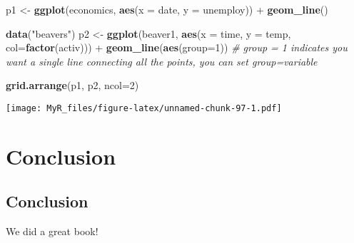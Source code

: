 \documentclass[]{book}
\newenvironment{Shaded}{}{}
\newcommand{\CommentTok}[1]{\textcolor[rgb]{0.38,0.63,0.69}{\textit{#1}}}
\newcommand{\DataTypeTok}[1]{\textcolor[rgb]{0.56,0.13,0.00}{#1}}
\newcommand{\DecValTok}[1]{\textcolor[rgb]{0.25,0.63,0.44}{#1}}
\newcommand{\KeywordTok}[1]{\textcolor[rgb]{0.00,0.44,0.13}{\textbf{#1}}}
\newcommand{\NormalTok}[1]{#1}
\newcommand{\OperatorTok}[1]{\textcolor[rgb]{0.40,0.40,0.40}{#1}}
\newcommand{\StringTok}[1]{\textcolor[rgb]{0.25,0.44,0.63}{#1}}
\theoremstyle{definition}
\theoremstyle{definition}
\theoremstyle{definition}
\theoremstyle{remark}
\begin{document}
\begin{Shaded}
\begin{Highlighting}[]
\NormalTok{p1 <-}\StringTok{ }\KeywordTok{ggplot}\NormalTok{(economics, }\KeywordTok{aes}\NormalTok{(}\DataTypeTok{x =}\NormalTok{ date, }\DataTypeTok{y =}\NormalTok{ unemploy)) }\OperatorTok{+}\StringTok{ }
\KeywordTok{geom_line}\NormalTok{()}

\KeywordTok{data}\NormalTok{(}\StringTok{"beavers"}\NormalTok{)}
\NormalTok{p2 <-}\StringTok{ }\KeywordTok{ggplot}\NormalTok{(beaver1, }\KeywordTok{aes}\NormalTok{(}\DataTypeTok{x =}\NormalTok{ time, }\DataTypeTok{y =}\NormalTok{ temp, }\DataTypeTok{col=}\KeywordTok{factor}\NormalTok{(activ))) }\OperatorTok{+}\StringTok{ }
\KeywordTok{geom_line}\NormalTok{(}\KeywordTok{aes}\NormalTok{(}\DataTypeTok{group=}\DecValTok{1}\NormalTok{)) }\CommentTok{# group = 1 indicates you want a single line connecting all the points, you can set group=variable}

\KeywordTok{grid.arrange}\NormalTok{(p1, p2, }\DataTypeTok{ncol=}\DecValTok{2}\NormalTok{)}
\end{Highlighting}
\end{Shaded}

\texttt{[image: MyR\_files/figure-latex/unnamed-chunk-97-1.pdf]}

\hypertarget{part-conclusion}{%
\part{Conclusion}\label{part-conclusion}}

\hypertarget{conclusion}{%
\chapter{Conclusion}\label{conclusion}}

We did a great book!


\end{document}
